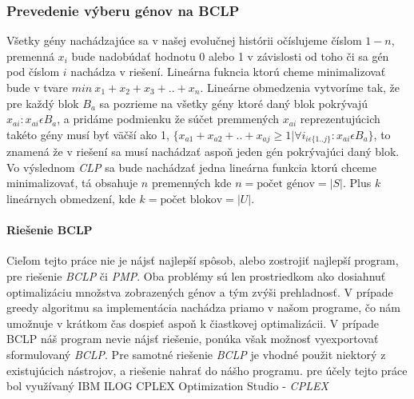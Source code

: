 \subsubsection{Prevedenie výberu génov na BCLP}
Všetky gény nachádzajúce sa v našej evolučnej histórii očíslujeme číslom $1-n$, 
premenná $x_i$ bude nadobúdať hodnotu 0 alebo 1 v závislosti od toho či sa gén pod číslom $i$ nachádza v riešení.
Lineárna fukncia ktorú cheme minimalizovať bude v tvare $min\ x_1 + x_2 +x_3 + .. +x_n$. Lineárne obmedzenia vytvoríme tak,
že pre každý blok $B_a$ sa pozrieme na všetky gény ktoré daný blok pokrývajú $x_{ai}:x_{ai} \epsilon B_a$,
a pridáme podmienku že súčet premmených $x_{ai}$ reprezentujúcich takéto gény musí byť väčší ako 1,
\( \{x_{a1}+x_{a2}+..+x_{aj} \geq 1|\forall i_{i\epsilon \{1..j\}}:x_{ai}\epsilon B_a \}\),
to znamená že v riešení sa musí nachádzať aspoň jeden gén pokrývajúci daný blok.
Vo výslednom \emph{CLP} sa bude nachádzať jedna lineárna funkcia ktorú chceme minimalizovať, tá obsahuje $n$ premenných kde \(n=\text{počet génov}=|S|\).
Plus $k$ lineárnych obmedzení, kde \(k=\text{počet blokov}=|U|\).
\paragraph{Riešenie BCLP}
Cieľom tejto práce nie je nájsť najlepší spôsob,
alebo zostrojiť najlepší program, pre riešenie \emph{BCLP} či \emph{PMP}.
Oba problémy sú len prostriedkom ako dosiahnuť optimalizáciu množstva zobrazených génov a tým zvýši prehladnosť.
V prípade greedy algoritmu sa implementácia nachádza priamo v našom programe,
čo nám umožnuje v krátkom čas dospieť aspoň k čiastkovej optimalizácii.
V prípade BCLP náš program nevie nájsť riešenie, ponúka však možnosť vyexportovať sformulovaný \emph{BCLP}.
Pre samotné riešenie \emph{BCLP} je vhodné použit niektorý z existujúcich nástrojov\cite{wiki}, 
a riešenie nahrať do nášho programu. pre účely tejto práce bol využívaný IBM ILOG CPLEX Optimization Studio - \emph{CPLEX}
